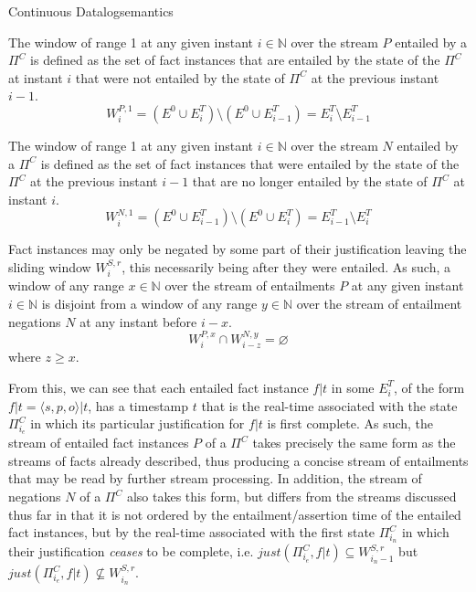 \begin{nestedsection}{Continuous Datalog}{semantics}
\begin{axiom}
\label{axiom:continuous datalog: positive window increment}
The window of range 1 at any given instant ${i \in \mathbb{N}}$ over
the stream $P$ entailed by a $\Pi^C$ is defined as the set of fact instances
that are entailed by the state of the $\Pi^C$ at instant $i$ that were
not entailed by the state of $\Pi^C$ at the previous instant ${i-1}$.
\begin{equation*}
W^{P,1}_{i} = \left( E^0 \cup E^T_{i} \right) \setminus
\left( E^0 \cup E^T_{i-1} \right) = E^T_{i} \setminus E^T_{i-1}
\end{equation*}
\end{axiom}
\begin{axiom}
\label{axiom:continuous datalog: negative window increment}
The window of range 1 at any given instant ${i \in \mathbb{N}}$ over
the stream $N$ entailed by a $\Pi^C$ is defined as the set of fact instances
that were entailed by the state of the $\Pi^C$ at the previous instant
${i-1}$ that are no longer entailed by the state of $\Pi^C$ at instant $i$.
\begin{equation*}
W^{N,1}_{i} = \left( E^0 \cup E^T_{i-1} \right) \setminus
\left( E^0 \cup E^T_{i} \right) = E^T_{i-1} \setminus E^T_{i}
\end{equation*}
\end{axiom}

\begin{axiom}
\label{axiom:continuous datalog: entailment precedes negation}
Fact instances may only be negated by some part of their justification leaving
the sliding window $W^{S,r}_{i}$, this necessarily being after they
were entailed.  As such, a window of any range ${x \in \mathbb{N}}$
over the stream of entailments $P$ at any given instant ${i \in \mathbb{N}}$
is disjoint from a window of any range ${y \in \mathbb{N}}$ over the
stream of entailment negations $N$ at any instant before ${i - x}$.
\begin{equation*}
W^{P,x}_{i} \cap W^{N,y}_{i-z} = \varnothing
\end{equation*}
where $z \geq x$.
\end{axiom}

From this, we can see that each entailed fact instance ${f|t}$ in some
$E^T_{i}$, of the form ${f|t = \langle s, p, o \rangle | t}$, has a
timestamp $t$ that is the real-time associated with the state
$\Pi^C_{i_{e}}$ in which its particular justification for ${f|t}$ is
first complete. As such, the stream of entailed fact instances $P$ of
a $\Pi^C$ takes precisely the same form as the streams of facts already
described, thus producing a concise stream of entailments that may be
read by further stream processing.  In addition, the stream of negations
$N$ of a $\Pi^C$ also takes this form, but differs from the streams
discussed thus far in that it is not ordered by the entailment/assertion
time of the entailed fact instances, but by the real-time associated
with the first state $\Pi^C_{i_{n}}$ in which their justification
\emph{ceases} to be complete, i.e. ${just(\Pi^C_{i_{e}}, f|t) \subseteq W^{S,r}_{i_n - 1}}$
but ${just(\Pi^C_{i_{e}}, f|t) \not\subseteq W^{S,r}_{i_n}}$.


\end{nestedsection}

